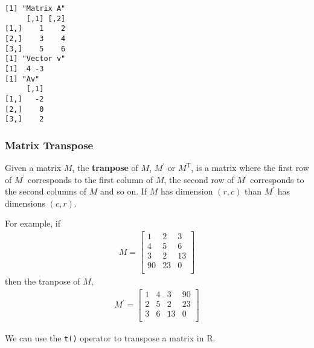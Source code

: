     \begin{Verbatim}[commandchars=\\\{\}]
[1] "Matrix A"
     [,1] [,2]
[1,]    1    2
[2,]    3    4
[3,]    5    6
[1] "Vector v"
[1]  4 -3
[1] "Av"
     [,1]
[1,]   -2
[2,]    0
[3,]    2
    \end{Verbatim}

    \hypertarget{matrix-transpose}{%
\subsubsection{Matrix Transpose}\label{matrix-transpose}}

Given a matrix \(M\), the \textbf{tranpose} of \(M\), \(M^{'}\) or
\(M^{\text{T}}\), is a matrix where the first row of \(M^{'}\)
corresponds to the first column of \(M\), the second row of \(M^{'}\)
corresponds to the second columns of \(M\) and so on. If \(M\) has
dimension \((r,c)\) than \(M^{'}\) has dimensions \((c,r)\).

For example, if \begin{align}
    M = \left [ \begin{matrix}
            1 & 2 & 3 \\
            4 & 5 & 6 \\
            3 & 2 & 13 \\
            90 & 23 & 0 \\
         \end{matrix} \right ]
\end{align} then the tranpose of \(M\), \begin{align}
    M^{'} = \left [ \begin{matrix}
            1 & 4 & 3 & 90 \\
            2 & 5 & 2 & 23 \\ 
            3 &  6 &  13 & 0 \\
         \end{matrix} \right ]   
\end{align}

We can use the \texttt{t()} operator to transpose a matrix in R.

